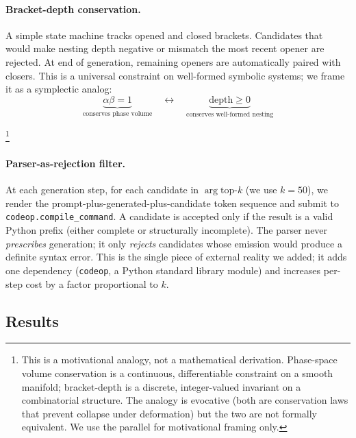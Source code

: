 \documentclass[11pt,a4paper]{article}
\begin{document}
\paragraph{Bracket-depth conservation.} A simple state machine tracks opened and closed brackets. Candidates that would make nesting depth negative or mismatch the most recent opener are rejected. At end of generation, remaining openers are automatically paired with closers. This is a universal constraint on well-formed symbolic systems; we frame it as a symplectic analog:
\begin{equation}
\underbrace{\alpha \beta = 1}_{\text{conserves phase volume}} \quad\longleftrightarrow\quad \underbrace{\text{depth} \geq 0}_{\text{conserves well-formed nesting}}
\end{equation}

\footnote{This is a motivational analogy, not a mathematical derivation. Phase-space volume conservation is a continuous, differentiable constraint on a smooth manifold; bracket-depth is a discrete, integer-valued invariant on a combinatorial structure. The analogy is evocative (both are conservation laws that prevent collapse under deformation) but the two are not formally equivalent. We use the parallel for motivational framing only.}

\paragraph{Parser-as-rejection filter.} At each generation step, for each candidate in $\arg\text{top-}k$ (we use $k = 50$), we render the prompt-plus-generated-plus-candidate token sequence and submit to \texttt{codeop.compile\_command}. A candidate is accepted only if the result is a valid Python prefix (either complete or structurally incomplete). The parser never \emph{prescribes} generation; it only \emph{rejects} candidates whose emission would produce a definite syntax error. This is the single piece of external reality we added; it adds one dependency (\texttt{codeop}, a Python standard library module) and increases per-step cost by a factor proportional to $k$.

\subsection{Results}
\end{document}
